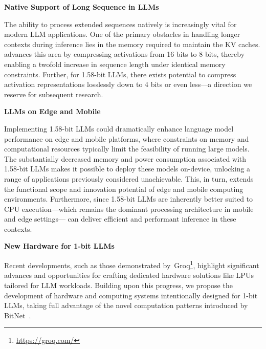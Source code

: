 \textbf{Native Support of Long Sequence in LLMs}

The ability to process extended sequences natively is increasingly vital for modern LLM applications. One of the primary obstacles in handling longer contexts during inference lies in the memory required to maintain the KV caches.  advances this area by compressing activations from 16 bits to 8 bits, thereby enabling a twofold increase in sequence length under identical memory constraints. Further, for 1.58-bit LLMs, there exists potential to compress activation representations losslessly down to 4 bits or even less—a direction we reserve for subsequent research.

\textbf{LLMs on Edge and Mobile}

Implementing 1.58-bit LLMs could dramatically enhance language model performance on edge and mobile platforms, where constraints on memory and computational resources typically limit the feasibility of running large models. The substantially decreased memory and power consumption associated with 1.58-bit LLMs makes it possible to deploy these models on-device, unlocking a range of applications previously considered unachievable. This, in turn, extends the functional scope and innovation potential of edge and mobile computing environments. Furthermore, since 1.58-bit LLMs are inherently better suited to CPU execution—which remains the dominant processing architecture in mobile and edge settings— can deliver efficient and performant inference in these contexts.

\textbf{New Hardware for 1-bit LLMs}

Recent developments, such as those demonstrated by~Groq\footnote{\url{https://groq.com/}}, highlight significant advances and opportunities for crafting dedicated hardware solutions like LPUs tailored for LLM workloads. Building upon this progress, we propose the development of hardware and computing systems intentionally designed for 1-bit LLMs, taking full advantage of the novel computation patterns introduced by BitNet~\cite{bitnet}.